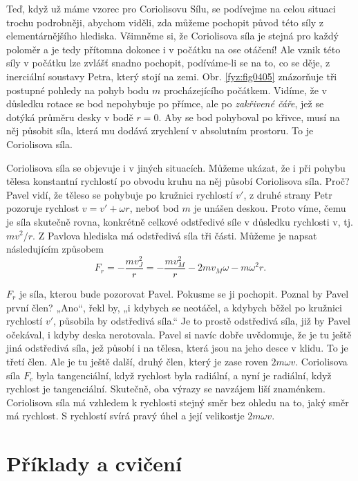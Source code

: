     Teď, když už máme vzorec pro Coriolisovu Sílu, se podívejme na celou situaci trochu podrobněji,
    abychom viděli, zda můžeme pochopit původ této síly z elementárnějšího hlediska. Všimněme si, že
    Coriolisova síla je stejná pro každý poloměr a je tedy přítomna dokonce i v počátku na ose
    otáčení! Ale vznik této síly v počátku lze zvlášť snadno pochopit, podíváme-li se na to, co se
    děje, z inerciální soustavy Petra, který stojí na zemi. Obr. \ref{fyz:fig0405} znázorňuje tři
    postupné pohledy na pohyb bodu \(m\) procházejícího počátkem. Vidíme, že v důsledku rotace se
    bod nepohybuje po přímce, ale po \emph{zakřivené čáře}, jež se dotýká průměru desky v bodě
    \(r=0\). Aby se bod pohyboval po křivce, musí na něj působit síla, která mu dodává zrychlení v
    absolutním prostoru. To je Coriolisova síla.
    
    Coriolisova síla se objevuje i v jiných situacích. Můžeme ukázat, že i při pohybu tělesa
    konstantní rychlostí po obvodu kruhu na něj působí Coriolisova síla. Proč? Pavel vidí, že těleso
    se pohybuje po kružnici rychlostí \(v'\), z druhé strany Petr pozoruje rychlost \(v = v' + ωr\),
    neboť bod \(m\) je unášen deskou. Proto víme, čemu je síla skutečně rovna, konkrétně celkové
    odstředivé síle v důsledku rychlosti v, tj. \(mv^2/r\). Z Pavlova hlediska má odstředivá síla
    tři části. Můžeme je napsat následujícím způsobem
    \begin{equation*}
      F_r=-\frac{mv_J^2}{r}=-\frac{mv_M^2}{r} - 2mv_M\omega-m\omega^2r.
    \end{equation*}

    \(F_r\) je síla, kterou bude pozorovat Pavel. Pokusme se ji pochopit. Poznal by Pavel první
    člen? „Ano“, řekl by, „i kdybych se neotáčel, a kdybych běžel po kružnici rychlostí \(v'\),
    působila by odstředivá síla.“ Je to prostě odstředivá síla, již by Pavel očekával, i kdyby deska
    nerotovala. Pavel si navíc dobře uvědomuje, že je tu ještě jiná odstředivá síla, jež působí i na
    tělesa, která jsou na jeho desce v klidu. To je třetí člen. Ale je tu ještě další, druhý člen,
    který je zase roven \(2mωv\). Coriolisova síla \(F_c\) byla tangenciální, když rychlost byla
    radiální, a nyní je radiální, když rychlost je tangenciální. Skutečně, oba výrazy se navzájem
    liší znaménkem. Coriolisova síla má vzhledem k rychlosti stejný směr bez ohledu na to, jaký směr
    má rychlost. S rychlostí svírá pravý úhel a její velikostje \(2mωv\).
    
  \section{Příklady a cvičení}\label{fyz:IchapXIXsecV}

